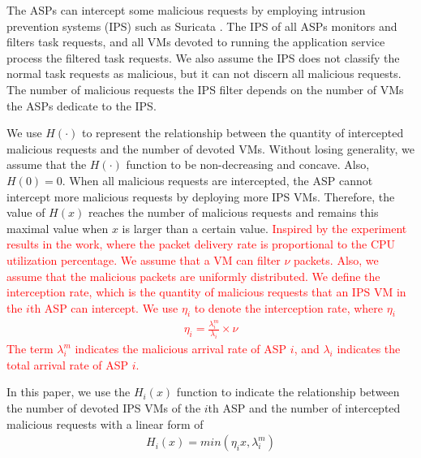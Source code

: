 \documentclass[10pt,journal, compsoc]{IEEEtran}
\begin{document}
The ASPs can intercept some malicious requests by employing intrusion prevention systems (IPS) such as Suricata \cite{Suricata}. The IPS of all ASPs monitors and filters task requests, and all VMs devoted to running the application service process the filtered task requests. We also assume the IPS does not classify the normal task requests as malicious, but it can not discern all malicious requests. The number of malicious requests the IPS filter depends on the number of VMs the ASPs dedicate to the IPS. 

We use $H(\cdot)$ to represent the relationship between the quantity of intercepted malicious requests and the number of devoted VMs. Without losing generality, we assume that the $H(\cdot)$ function to be non-decreasing and concave. Also, $H(0)=0$. When all malicious requests are intercepted, the ASP cannot intercept more malicious requests by deploying more IPS VMs. Therefore, the value of $H(x)$ reaches the number of malicious requests and remains this maximal value when $x$ is larger than a certain value. \textcolor{red}{Inspired by the experiment results in the work\cite{chi}, where the packet delivery rate is proportional to the CPU utilization percentage. We assume that a VM can filter $\nu$ packets. Also, we assume that the malicious packets are uniformly distributed. We define the interception rate, which is the quantity of malicious requests that an IPS VM in the $i$th ASP can intercept. We use $\eta_i$ to denote the interception rate, where $\eta_i$
\begin{equation}
   \begin{aligned}
    \eta_i = \frac{\lambda_i^m}{\lambda_i} \times \nu
    \end{aligned} 
\end{equation}
The term $\lambda_i^m$ indicates the malicious arrival rate of ASP $i$, and $\lambda_i$ indicates the total arrival rate of ASP $i$.}

In this paper, we use the $H_i(x)$ function to indicate the relationship between the number of devoted IPS VMs of the $i$th ASP and the number of intercepted malicious requests with a linear form of
\begin{equation}
\begin{aligned}
    H_i(x) = min(\eta_i{x}, \lambda_i^m)
\end{aligned}
\end{equation}
\end{document}
